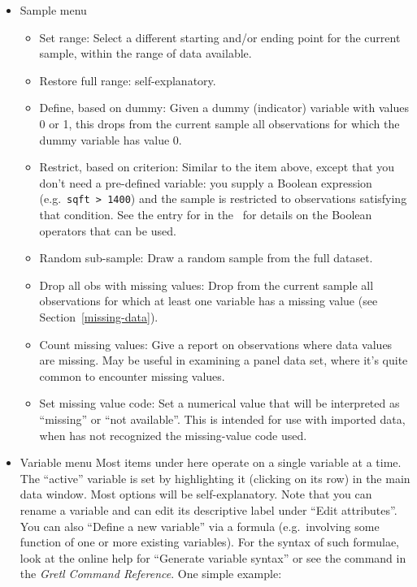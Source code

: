 \begin{itemize}
\item \textsf{Sample menu}
  \begin{itemize}
  \item \textsf{Set range}: Select a different starting and/or ending
    point for the current sample, within the range of data available.
  \item \textsf{Restore full range}: self-explanatory.
  \item \textsf{Define, based on dummy}: Given a dummy (indicator)
    variable with values 0 or 1, this drops from the current sample
    all observations for which the dummy variable has value 0.
  \item \textsf{Restrict, based on criterion}: Similar to the item
    above, except that you don't need a pre-defined variable: you
    supply a Boolean expression (e.g.\ \verb+sqft > 1400+) and the
    sample is restricted to observations satisfying that condition.
    See the entry for  in the \GCR\
    for details on the Boolean operators that can be used.
  \item \textsf{Random sub-sample}: Draw a random sample from the full dataset.
  \item \textsf{Drop all obs with missing values}: Drop from the
    current sample all observations for which at least one variable
    has a missing value (see Section~\ref{missing-data}).
  \item \textsf{Count missing values}: Give a report on observations
    where data values are missing. May be useful in examining a panel
    data set, where it's quite common to encounter missing values.
  \item \textsf{Set missing value code}: Set a numerical value that
    will be interpreted as ``missing'' or ``not available''.  This is
    intended for use with imported data, when \app{gretl} has not
    recognized the missing-value code used.
  \end{itemize}

\item \textsf{Variable menu} Most items under here operate on a single
  variable at a time.  The ``active'' variable is set by highlighting
  it (clicking on its row) in the main data window.  Most options will
  be self-explanatory.  Note that you can rename a variable and can
  edit its descriptive label under ``Edit attributes''. You can also
  ``Define a new variable'' via a formula (e.g.\ involving some
  function of one or more existing variables). For the syntax of such
  formulae, look at the online help for ``Generate variable syntax''
  or see the \cmd{genr} command in the \emph{Gretl Command Reference}.
  One simple example:
          

\end{itemize}
